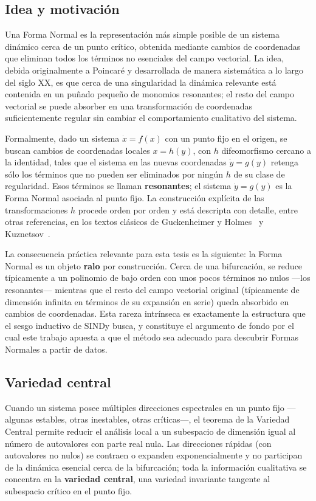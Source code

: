 \subsection{Idea y motivación}

Una Forma Normal es la representación más simple posible de un sistema dinámico cerca de un punto crítico, obtenida mediante cambios de coordenadas que eliminan todos los términos no esenciales del campo vectorial. La idea, debida originalmente a Poincaré y desarrollada de manera sistemática a lo largo del siglo XX, es que cerca de una singularidad la dinámica relevante está contenida en un puñado pequeño de monomios resonantes; el resto del campo vectorial se puede absorber en una transformación de coordenadas suficientemente regular sin cambiar el comportamiento cualitativo del sistema.

Formalmente, dado un sistema $\dot{x} = f(x)$ con un punto fijo en el origen, se buscan cambios de coordenadas locales $x = h(y)$, con $h$ difeomorfismo cercano a la identidad, tales que el sistema en las nuevas coordenadas $\dot{y} = g(y)$ retenga sólo los términos que no pueden ser eliminados por ningún $h$ de su clase de regularidad. Esos términos se llaman \textbf{resonantes}; el sistema $\dot{y} = g(y)$ es la Forma Normal asociada al punto fijo. La construcción explícita de las transformaciones $h$ procede orden por orden y está descripta con detalle, entre otras referencias, en los textos clásicos de Guckenheimer y Holmes~\cite{guckenheimer1983} y Kuznetsov~\cite{kuznetsov2004}.

La consecuencia práctica relevante para esta tesis es la siguiente: la Forma Normal es un objeto \textbf{ralo} por construcción. Cerca de una bifurcación, se reduce típicamente a un polinomio de bajo orden con unos pocos términos no nulos —los resonantes— mientras que el resto del campo vectorial original (típicamente de dimensión infinita en términos de su expansión en serie) queda absorbido en cambios de coordenadas. Esta rareza intrínseca es exactamente la estructura que el sesgo inductivo de SINDy busca, y constituye el argumento de fondo por el cual este trabajo apuesta a que el método sea adecuado para descubrir Formas Normales a partir de datos.

\subsection{Variedad central}

Cuando un sistema posee múltiples direcciones espectrales en un punto fijo —algunas estables, otras inestables, otras críticas—, el teorema de la Variedad Central permite reducir el análisis local a un subespacio de dimensión igual al número de autovalores con parte real nula. Las direcciones rápidas (con autovalores no nulos) se contraen o expanden exponencialmente y no participan de la dinámica esencial cerca de la bifurcación; toda la información cualitativa se concentra en la \textbf{variedad central}, una variedad invariante tangente al subespacio crítico en el punto fijo.

